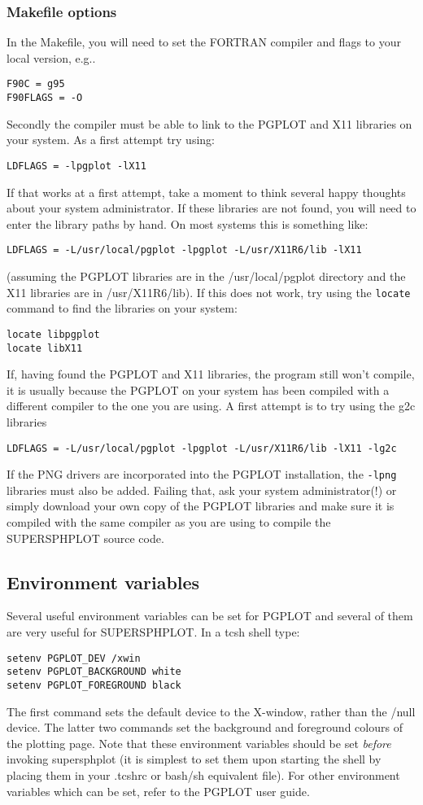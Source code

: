 \documentclass[a4paper,12pt]{article}
\begin{document}
\subsubsection{Makefile options}

 In the Makefile, you will need to set the FORTRAN compiler and flags to your local version, e.g..
\begin{verbatim}
F90C = g95
F90FLAGS = -O
\end{verbatim}
 Secondly the compiler must be able to link to the PGPLOT and X11 libraries on
your system. As a first attempt try using:
\begin{verbatim}
LDFLAGS = -lpgplot -lX11
\end{verbatim}
If that works at a first attempt, take a moment to think several happy thoughts about your system
administrator. If these libraries are not found, you will need to enter the
library paths by hand. On most systems this is something like:
\begin{verbatim}
LDFLAGS = -L/usr/local/pgplot -lpgplot -L/usr/X11R6/lib -lX11
\end{verbatim}
(assuming the PGPLOT libraries are in the /usr/local/pgplot directory and the
X11 libraries are in /usr/X11R6/lib). If this does not work, try using the
\verb+locate+ command to find the libraries on your system:
\begin{verbatim}
locate libpgplot
locate libX11
\end{verbatim}
 If, having found the PGPLOT and X11
libraries, the program still won't compile, it is usually
because the PGPLOT on your system has been compiled with a different compiler to
the one you are using. A first attempt is to try using the g2c libraries
\begin{verbatim}
LDFLAGS = -L/usr/local/pgplot -lpgplot -L/usr/X11R6/lib -lX11 -lg2c
\end{verbatim}
If the PNG drivers are incorporated into the PGPLOT installation, the \verb+-lpng+ libraries must also be added.
Failing that, ask your system administrator(!) or simply download your own copy of
the PGPLOT libraries and make sure it is compiled with the same compiler as you
are using to compile the SUPERSPHPLOT source code.

\subsection{Environment variables}
 Several useful environment variables can be set for PGPLOT and several of them
are very useful for SUPERSPHPLOT. In a tcsh shell type:
\begin{verbatim}
setenv PGPLOT_DEV /xwin
setenv PGPLOT_BACKGROUND white
setenv PGPLOT_FOREGROUND black
\end{verbatim}
The first command sets the default device to the X-window, rather than the /null
device. The latter two commands set the background and foreground colours of the
plotting page. Note that these environment variables should be set \emph{before}
invoking supersphplot (it is simplest to set them upon starting the shell by placing
them in your .tcshrc or bash/sh equivalent file). For other environment
variables which can be set, refer to the PGPLOT user guide.
\end{document}
